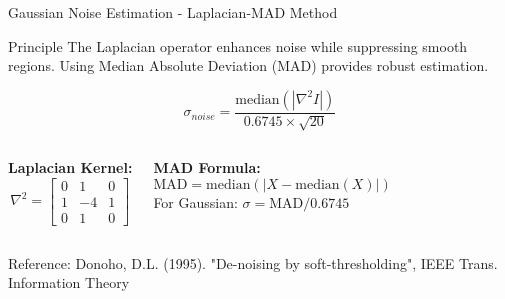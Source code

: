 \documentclass[aspectratio=169]{beamer}
\begin{document}
\begin{frame}{Gaussian Noise Estimation - Laplacian-MAD Method}
    \begin{block}{Principle}
        The Laplacian operator enhances noise while suppressing smooth regions. Using Median Absolute Deviation (MAD) provides robust estimation.
    \end{block}
    
    \begin{equation}
        \sigma_{noise} = \frac{\text{median}(|\nabla^2 I|)}{0.6745 \times \sqrt{20}}
    \end{equation}
    
    \begin{columns}
        \textbf{Laplacian Kernel:}
        \begin{equation}
            \nabla^2 = \begin{bmatrix} 0 & 1 & 0 \\ 1 & -4 & 1 \\ 0 & 1 & 0 \end{bmatrix}
        \end{equation}
        
        \textbf{MAD Formula:}
        \begin{equation}
            \text{MAD} = \text{median}(|X - \text{median}(X)|)
        \end{equation}
        For Gaussian: $\sigma = \text{MAD} / 0.6745$
    \end{columns}
    
    \vspace{0.3cm}
    \small{Reference: Donoho, D.L. (1995). "De-noising by soft-thresholding", IEEE Trans. Information Theory}
\end{frame}
\end{document}
